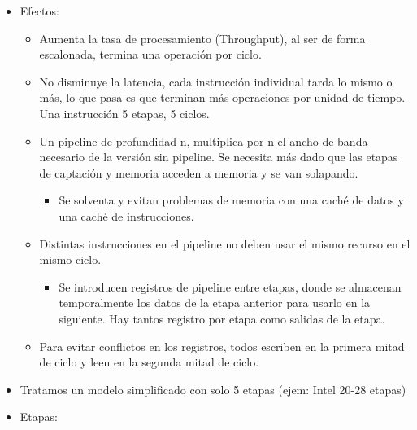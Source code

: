 \documentclass[12pt, twoside, openright]{report} %
\begin{document}
  \begin{itemize}
  
  \item
    Efectos:

    \begin{itemize}
    
    \item
      Aumenta la tasa de procesamiento (Throughput), al ser de forma
      escalonada, termina una operación por ciclo.
    \item
      No disminuye la latencia, cada instrucción individual tarda lo
      mismo o más, lo que pasa es que terminan más operaciones por
      unidad de tiempo. Una instrucción 5 etapas, 5 ciclos.
    \item
      Un pipeline de profundidad n, multiplica por n el ancho de banda
      necesario de la versión sin pipeline. Se necesita más dado que las
      etapas de captación y memoria acceden a memoria y se van
      solapando.

      \begin{itemize}
      
      \item
        Se solventa y evitan problemas de memoria con una caché de datos
        y una caché de instrucciones.
      \end{itemize}
    \item
      Distintas instrucciones en el pipeline no deben usar el mismo
      recurso en el mismo ciclo.

      \begin{itemize}
      
      \item
        Se introducen registros de pipeline entre etapas, donde se
        almacenan temporalmente los datos de la etapa anterior para
        usarlo en la siguiente. Hay tantos registro por etapa como
        salidas de la etapa.
      \end{itemize}
    \item
      Para evitar conflictos en los registros, todos escriben en la
      primera mitad de ciclo y leen en la segunda mitad de ciclo.
    \end{itemize}
  \item
    Tratamos un modelo simplificado con solo 5 etapas (ejem: Intel 20-28
    etapas)
    \pagebreak
    \item
    Etapas:
    \begin{figure}[H]
      {\def\svgwidth{1.1\textwidth}
        }
    \end{figure}
    \begin{itemize}
    

\end{itemize}
\end{itemize}
\end{document}
